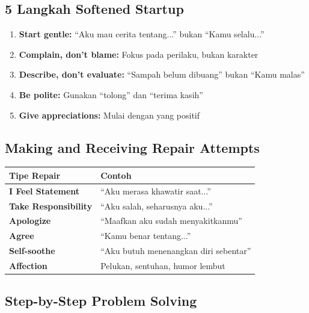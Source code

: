 \subsection{5 Langkah Softened Startup}

\begin{tipbox}
\begin{enumerate}
    \item \textbf{Start gentle:} ``Aku mau cerita tentang...'' bukan ``Kamu selalu...''
    \item \textbf{Complain, don't blame:} Fokus pada perilaku, bukan karakter
    \item \textbf{Describe, don't evaluate:} ``Sampah belum dibuang'' bukan ``Kamu malas''
    \item \textbf{Be polite:} Gunakan ``tolong'' dan ``terima kasih''
    \item \textbf{Give appreciations:} Mulai dengan yang positif
\end{enumerate}
\end{tipbox}

\subsection{Making and Receiving Repair Attempts}

\begin{center}
\renewcommand{\arraystretch}{1.4}
\begin{tabular}{|>{\raggedright}p{4cm}|>{\raggedright\arraybackslash}p{9cm}|}
\hline
\rowcolor{sagegreen!20}
\textbf{Tipe Repair} & \textbf{Contoh} \\
\hline
\textbf{I Feel Statement} & ``Aku merasa khawatir saat...'' \\
\hline
\textbf{Take Responsibility} & ``Aku salah, seharusnya aku...'' \\
\hline
\textbf{Apologize} & ``Maafkan aku sudah menyakitkanmu'' \\
\hline
\textbf{Agree} & ``Kamu benar tentang...'' \\
\hline
\textbf{Self-soothe} & ``Aku butuh menenangkan diri sebentar'' \\
\hline
\textbf{Affection} & Pelukan, sentuhan, humor lembut \\
\hline
\end{tabular}
\end{center}

\subsection{Step-by-Step Problem Solving}

